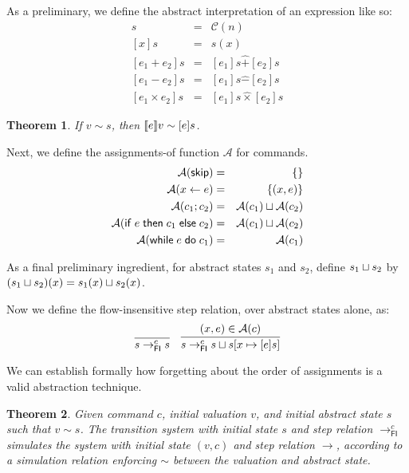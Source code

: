 \documentclass{amsbook}
\newtheorem{theorem}{Theorem}[chapter]
\theoremstyle{definition}
\theoremstyle{remark}
\numberwithin{section}{chapter}
\numberwithin{equation}{chapter}
\begin{document}
\newcommand{\absexp}[1]{[#1]}

As a preliminary, we define the abstract interpretation of an expression like so:
\begin{eqnarray*}
  \absexp{n}s &=& \mathcal C(n) \\
  \absexp{x}s &=& s(x) \\
  \absexp{e_1 + e_2}s &=& \absexp{e_1}s \hat{+} \absexp{e_2}s \\
  \absexp{e_1 - e_2}s &=& \absexp{e_1}s \hat{-} \absexp{e_2}s \\
  \absexp{e_1 \times e_2}s &=& \absexp{e_1}s \hat{\times} \absexp{e_2}s
\end{eqnarray*}

\begin{theorem}
  If $v \sim s$, then $\denote{e}v \sim \absexp{e}s$.
\end{theorem}

\newcommand{\asgns}[1]{\mathcal A(#1)}

Next, we define the assignments-of function $\mathcal A$ for commands.
\begin{eqnarray*}
  \asgns{\skipe} &=& \{\} \\
  \asgns{\assign{x}{e}} &=& \{(x, e)\} \\
  \asgns{c_1; c_2} &=& \asgns{c_1} \join \asgns{c_2} \\
  \asgns{\ifte{e}{c_1}{c_2}} &=& \asgns{c_1} \join \asgns{c_2} \\
  \asgns{\while{e}{c_1}} &=& \asgns{c_1}
\end{eqnarray*}

As a final preliminary ingredient, for abstract states $s_1$ and $s_2$, define $s_1 \sqcup s_2$ by $(s_1 \sqcup s_2)(x) = s_1(x) \sqcup s_2(x)$.

Now we define the flow-insensitive step relation, over abstract states alone, as:
$$\infer{s \to^c_\mathsf{FI} s}{}
\quad \infer{s \to^c_\mathsf{FI} s \join \mupd{s}{x}{\absexp{e}s}}{
  (x, e) \in \asgns{c}
}$$

We can establish formally how forgetting about the order of assignments is a valid abstraction technique.

\begin{theorem}\label{flow_insensitive_abstraction}
  \abstraction
  Given command $c$, initial valuation $v$, and initial abstract state $s$ such that $v \sim s$.  The transition system with initial state $s$ and step relation $\to^c_\mathsf{FI}$ simulates the system with initial state $(v, c)$ and step relation $\to$, according to a simulation relation enforcing $\sim$ between the valuation and abstract state.
\end{theorem}
\end{document}
